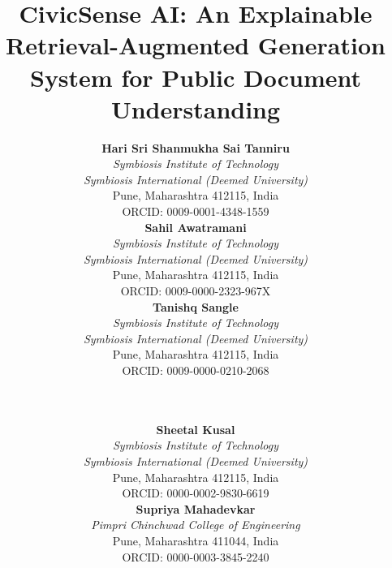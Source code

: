 \documentclass[conference]{IEEEtran}
\begin{document}
\title{CivicSense AI: An Explainable Retrieval-Augmented Generation System for
Public Document Understanding}

\author{
  \begin{minipage}[t]{0.3\textwidth}
    \centering
    \textbf{Hari Sri Shanmukha Sai Tanniru} \\
    \textit{\small Symbiosis Institute of Technology} \\
    \textit{\small Symbiosis International (Deemed University)} \\
    {\small Pune, Maharashtra 412115, India} \\
    {\small ORCID: 0009-0001-4348-1559}
  \end{minipage}
  \hfill
  \begin{minipage}[t]{0.3\textwidth}
    \centering
    \textbf{Sahil Awatramani} \\
    \textit{\small Symbiosis Institute of Technology} \\
    \textit{\small Symbiosis International (Deemed University)} \\
    {\small Pune, Maharashtra 412115, India} \\
    {\small ORCID: 0009-0000-2323-967X}
  \end{minipage}
  \hfill
  \begin{minipage}[t]{0.3\textwidth}
    \centering
    \textbf{Tanishq Sangle} \\
    \textit{\small Symbiosis Institute of Technology} \\
    \textit{\small Symbiosis International (Deemed University)} \\
    {\small Pune, Maharashtra 412115, India} \\
    {\small ORCID: 0009-0000-0210-2068}
  \end{minipage}

  \and %

  \vspace{0.5cm} %
\\ %
  \begin{minipage}[t]{0.45\textwidth}
    \centering
    \textbf{Sheetal Kusal} \\
    \textit{\small Symbiosis Institute of Technology} \\
    \textit{\small Symbiosis International (Deemed University)} \\
    {\small Pune, Maharashtra 412115, India} \\
    {\small ORCID: 0000-0002-9830-6619}
  \end{minipage}
  \hfill
  \begin{minipage}[t]{0.45\textwidth}
    \centering
    \textbf{Supriya Mahadevkar} \\
    \textit{\small Pimpri Chinchwad College of Engineering} \\
    {\small Pune, Maharashtra 411044, India} \\
    {\small ORCID: 0000-0003-3845-2240}
  \end{minipage}
}
\end{document}
